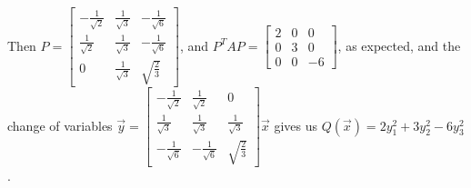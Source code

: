 \documentclass[10pt,english]{article}
\begin{document}
\begin{enumerate}
\begin{enumerate}
    Then $P=\begin{bmatrix}-\frac{1}{\sqrt{2}}&\frac{1}{\sqrt{3}}&-\frac{1}{\sqrt{6}}\\\frac{1}{\sqrt{2}}&\frac{1}{\sqrt{3}}&-\frac{1}{\sqrt{6}}\\0&\frac{1}{\sqrt{3}}&\sqrt{\frac{2}{3}}\end{bmatrix}$, and $P^TAP=\begin{bmatrix}2&0&0\\0&3&0\\0&0&-6\end{bmatrix}$, as expected, and the change of variables $\vec{y}=\begin{bmatrix}-\frac{1}{\sqrt{2}}&\frac{1}{\sqrt{2}}&0\\\frac{1}{\sqrt{3}}&\frac{1}{\sqrt{3}}&\frac{1}{\sqrt{3}}\\-\frac{1}{\sqrt{6}}&-\frac{1}{\sqrt{6}}&\sqrt{\frac{2}{3}}\end{bmatrix}\vec{x}$ gives us $Q(\vec{x})=2y_1^2+3y_2^2-6y_3^2$.
\end{enumerate}


\end{enumerate}
\end{document}
